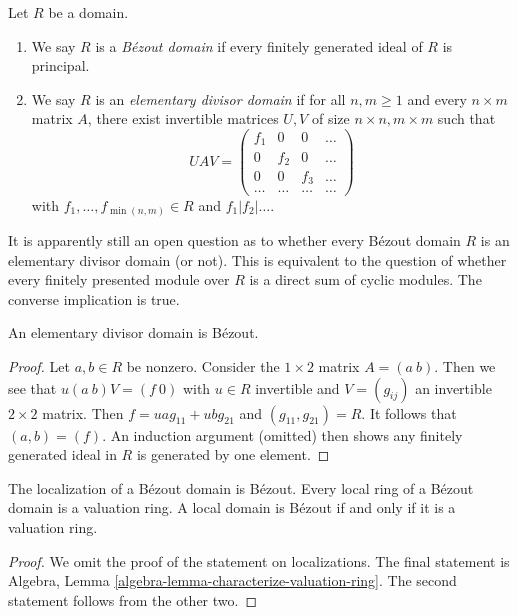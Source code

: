 \begin{definition}
\label{definition-bezout}
Let $R$ be a domain.
\begin{enumerate}
\item We say $R$ is a {\it B\'ezout domain} if every finitely generated
ideal of $R$ is principal.
\item We say $R$ is an {\it elementary divisor domain} if for
all $n , m \geq 1$ and every $n \times m$ matrix $A$, there
exist invertible matrices $U, V$ of size $n \times n, m \times m$
such that
$$
U A V =
\left(
\begin{matrix}
f_1 & 0 & 0 & \ldots \\
0 & f_2 & 0 & \ldots \\
0 & 0 & f_3 & \ldots \\
\ldots & \ldots & \ldots & \ldots
\end{matrix}
\right)
$$
with $f_1, \ldots, f_{\min(n, m)} \in R$ and $f_1 | f_2 | \ldots$.
\end{enumerate}
\end{definition}

\noindent
It is apparently still an open question as to whether every B\'ezout domain
$R$ is an elementary divisor domain (or not). This is equivalent to the
question of whether every finitely presented module over $R$ is a direct
sum of cyclic modules. The converse implication is true.

\begin{lemma}
\label{lemma-elementary-divisor-is-bezout}
An elementary divisor domain is B\'ezout.
\end{lemma}

\begin{proof}
Let $a, b \in R$ be nonzero. Consider the $1 \times 2$ matrix $A = (a\ b)$.
Then we see that $u(a\ b)V = (f\ 0)$ with $u \in R$ invertible
and $V = (g_{ij})$ an invertible $2 \times 2$ matrix.
Then $f = u a g_{11} + u b g_{2 1}$ and $(g_{11}, g_{2 1}) = R$.
It follows that $(a, b) = (f)$. An induction argument (omitted)
then shows any finitely generated ideal in $R$ is generated by one element.
\end{proof}

\begin{lemma}
\label{lemma-localize-bezout}
The localization of a B\'ezout domain is B\'ezout.
Every local ring of a B\'ezout domain is a valuation ring.
A local domain is B\'ezout if and only if it is a valuation ring.
\end{lemma}

\begin{proof}
We omit the proof of the statement on localizations. The final
statement is Algebra, Lemma \ref{algebra-lemma-characterize-valuation-ring}.
The second statement follows from the other two.
\end{proof}

